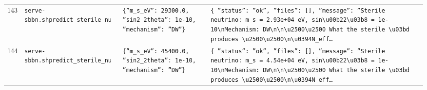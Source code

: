 \documentclass[11pt,a4paper]{article}
\begin{document}
\begin{longtable}{@{}p{}p{}p{}p{}@{}}
143 & \texttt{serve-sbbn.sh}\newline\texttt{predict\_\allowbreak{}sterile\_\allowbreak{}nu} & \texttt{\{''m\_\allowbreak{}s\_\allowbreak{}eV'':\allowbreak{} 29300.0,\allowbreak{} ''sin2\_\allowbreak{}2theta'':\allowbreak{} 1e-10,\allowbreak{} ''mechanism'':\allowbreak{} ''DW''\}\allowbreak{}} & \texttt{\{   ''status'':\allowbreak{} ''ok'',\allowbreak{}   ''files'':\allowbreak{} []\allowbreak{},\allowbreak{}   ''message'':\allowbreak{} ''Sterile neutrino:\allowbreak{} m\_\allowbreak{}s =\allowbreak{} 2.93e+04 eV,\allowbreak{} sin\textbackslash{}\allowbreak{}u00b22\textbackslash{}\allowbreak{}u03b8 =\allowbreak{} 1e-10\textbackslash{}\allowbreak{}nMechanism:\allowbreak{} DW\textbackslash{}\allowbreak{}n\textbackslash{}\allowbreak{}n\textbackslash{}\allowbreak{}u2500\textbackslash{}\allowbreak{}u2500 What the sterile \textbackslash{}\allowbreak{}u03bd produces \textbackslash{}\allowbreak{}u2500\textbackslash{}\allowbreak{}u2500\textbackslash{}\allowbreak{}n\textbackslash{}\allowbreak{}u0394N\_\allowbreak{}eff\ldots{}\allowbreak{}} \\
144 & \texttt{serve-sbbn.sh}\newline\texttt{predict\_\allowbreak{}sterile\_\allowbreak{}nu} & \texttt{\{''m\_\allowbreak{}s\_\allowbreak{}eV'':\allowbreak{} 45400.0,\allowbreak{} ''sin2\_\allowbreak{}2theta'':\allowbreak{} 1e-10,\allowbreak{} ''mechanism'':\allowbreak{} ''DW''\}\allowbreak{}} & \texttt{\{   ''status'':\allowbreak{} ''ok'',\allowbreak{}   ''files'':\allowbreak{} []\allowbreak{},\allowbreak{}   ''message'':\allowbreak{} ''Sterile neutrino:\allowbreak{} m\_\allowbreak{}s =\allowbreak{} 4.54e+04 eV,\allowbreak{} sin\textbackslash{}\allowbreak{}u00b22\textbackslash{}\allowbreak{}u03b8 =\allowbreak{} 1e-10\textbackslash{}\allowbreak{}nMechanism:\allowbreak{} DW\textbackslash{}\allowbreak{}n\textbackslash{}\allowbreak{}n\textbackslash{}\allowbreak{}u2500\textbackslash{}\allowbreak{}u2500 What the sterile \textbackslash{}\allowbreak{}u03bd produces \textbackslash{}\allowbreak{}u2500\textbackslash{}\allowbreak{}u2500\textbackslash{}\allowbreak{}n\textbackslash{}\allowbreak{}u0394N\_\allowbreak{}eff\ldots{}\allowbreak{}} \\

\end{longtable}
\end{document}
